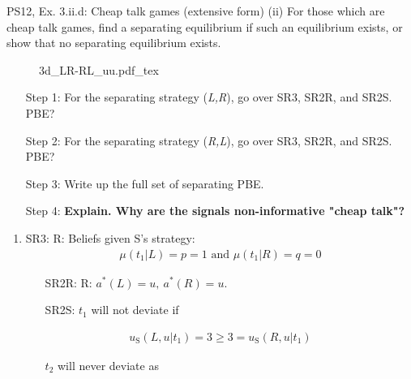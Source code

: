 \begin{frame}{PS12, Ex. 3.ii.d: Cheap talk games (extensive form)}
    (ii) For those which are cheap talk games, find a separating equilibrium if such an equilibrium exists, or show that no separating equilibrium exists.\vspace{-10pt}
    \begin{multicols}{2}
      \begin{figure}[!h]
        \center{}
        {3d_LR-RL_uu.pdf_tex}
      \end{figure}\vspace{-6pt}
      \begin{itemize}
        \item[Step 1:] For the separating strategy (\textit{L,R}), go over SR3, SR2R, and SR2S. PBE?
        \item[Step 2:] \vspace{-1pt}For the separating strategy (\textit{R,L}), go over SR3, SR2R, and SR2S. PBE?
        \item[Step 3:] \vspace{-1pt}Write up the full set of separating PBE.
        \item[Step 4:] \vspace{-1pt}\textbf{Explain. Why are the signals non-informative "cheap talk"?}
      \end{itemize}
      \vfill\null\columnbreak
      \begin{enumerate}
        \item SR3: R: Beliefs given S's strategy:\vspace{-8pt}
        \begin{align*}
          \mu(t_1|L)=p=1\text{ and }\mu(t_1|R)=q=0
        \end{align*}\vspace{-18pt}
        \begin{itemize}\normalsize
          \item[SR2R:] R: $a^*(L)=u,\ a^*(R)=u$.
          \item[SR2S:] $t_1$ will not deviate if
        \end{itemize}\vspace{-10pt}
        \begin{align*}
          u_\text{S}(L,u|t_1)=3\geq 3=u_\text{S}(R,u|t_1)
        \end{align*}\vspace{-18pt}
        \begin{itemize}\normalsize
          \item[] $t_2$ will never deviate as

\end{itemize}
\end{enumerate}
\end{multicols}
\end{frame}
